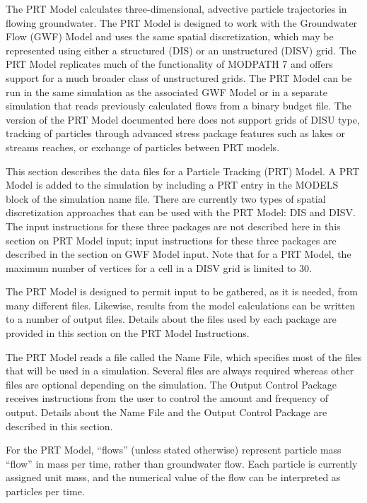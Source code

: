 The PRT Model calculates three-dimensional, advective particle trajectories in flowing groundwater. The PRT Model is designed to work with the Groundwater Flow (GWF) Model \citep{modflow6gwf} and uses the same spatial discretization, which may be represented using either a structured (DIS) or an unstructured (DISV) grid. The PRT Model replicates much of the functionality of MODPATH 7 \citep{pollock2016modpath7} and offers support for a much broader class of unstructured grids. The PRT Model can be run in the same simulation as the associated GWF Model or in a separate simulation that reads previously calculated flows from a binary budget file. The version of the PRT Model documented here does not support grids of DISU type, tracking of particles through advanced stress package features such as lakes or streams reaches, or exchange of particles between PRT models.

This section describes the data files for a \mf Particle Tracking (PRT) Model.  A PRT Model is added to the simulation by including a PRT entry in the MODELS block of the simulation name file.  There are currently two types of spatial discretization approaches that can be used with the PRT Model: DIS and DISV.  The input instructions for these three packages are not described here in this section on PRT Model input; input instructions for these three packages are described in the section on GWF Model input.  Note that for a PRT Model, the maximum number of vertices for a cell in a DISV grid is limited to 30.

The PRT Model is designed to permit input to be gathered, as it is needed, from many different files.  Likewise, results from the model calculations can be written to a number of output files. Details about the files used by each package are provided in this section on the PRT Model Instructions.

The PRT Model reads a file called the Name File, which specifies most of the files that will be used in a simulation. Several files are always required whereas other files are optional depending on the simulation. The Output Control Package receives instructions from the user to control the amount and frequency of output.  Details about the Name File and the Output Control Package are described in this section.

For the PRT Model, ``flows'' (unless stated otherwise) represent particle mass ``flow'' in mass per time, rather than groundwater flow.  Each particle is currently assigned unit mass, and the numerical value of the flow can be interpreted as particles per time.

